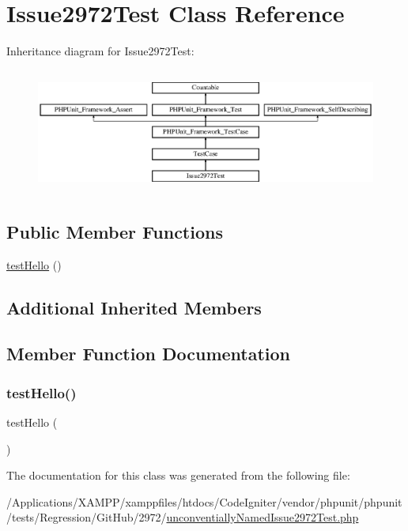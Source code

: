 \hypertarget{class_issue2972_1_1_issue2972_test}{}\section{Issue2972\+Test Class Reference}
\label{class_issue2972_1_1_issue2972_test}
Inheritance diagram for Issue2972\+Test\+:\begin{figure}[H]
\begin{center}
\leavevmode
\includegraphics[height=4.129793cm]{class_issue2972_1_1_issue2972_test}
\end{center}
\end{figure}
\subsection*{Public Member Functions}
\begin{DoxyCompactItemize}
\item 
\mbox{\hyperlink{class_issue2972_1_1_issue2972_test_ab46417f4ba57f7c2621e0ec50818ca12}{test\+Hello}} ()
\end{DoxyCompactItemize}
\subsection*{Additional Inherited Members}


\subsection{Member Function Documentation}
\mbox{\label{class_issue2972_1_1_issue2972_test_ab46417f4ba57f7c2621e0ec50818ca12}} 
\subsubsection{\texorpdfstring{test\+Hello()}{testHello()}}
{\footnotesize\ttfamily test\+Hello (\begin{DoxyParamCaption}{ }\end{DoxyParamCaption})}



The documentation for this class was generated from the following file\+:\begin{DoxyCompactItemize}
\item 
/\+Applications/\+X\+A\+M\+P\+P/xamppfiles/htdocs/\+Code\+Igniter/vendor/phpunit/phpunit/tests/\+Regression/\+Git\+Hub/2972/\mbox{\hyperlink{unconventially_named_issue2972_test_8php}{unconventially\+Named\+Issue2972\+Test.\+php}}\end{DoxyCompactItemize}
